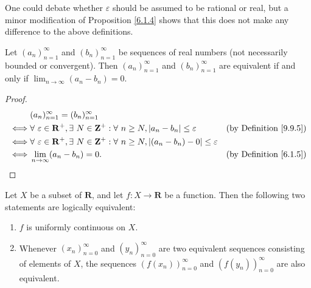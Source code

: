 \begin{remark}\label{9.9.6}
    One could debate whether \(\varepsilon\) should be assumed to be rational or real, but a minor modification of Proposition \ref{6.1.4} shows that this does not make any difference to the above definitions.
\end{remark}

\begin{lemma}\label{9.9.7}
    Let \((a_n)_{n = 1}^\infty\) and \((b_n)_{n = 1}^\infty\) be sequences of real numbers
    (not necessarily bounded or convergent).
    Then \((a_n)_{n = 1}^\infty\) and \((b_n)_{n = 1}^\infty\) are equivalent if and only if \(\lim_{n \to \infty} (a_n - b_n) = 0\).
\end{lemma}

\begin{proof}
    \begin{align*}
             & (a_n)_{n = 1}^\infty = (b_n)_{n = 1}^\infty                                                                                                                          \\
        \iff & \forall\ \varepsilon \in \mathbf{R}^+, \exists\ N \in \mathbf{Z}^+ : \forall\ n \geq N, \abs*{a_n - b_n} \leq \varepsilon       & \text{(by Definition \ref{9.9.5})} \\
        \iff & \forall\ \varepsilon \in \mathbf{R}^+, \exists\ N \in \mathbf{Z}^+ : \forall\ n \geq N, \abs*{(a_n - b_n) - 0} \leq \varepsilon                                      \\
        \iff & \lim_{n \to \infty} (a_n - b_n) = 0.                                                                                            & \text{(by Definition \ref{6.1.5})}
    \end{align*}
\end{proof}

\begin{proposition}\label{9.9.8}
    Let \(X\) be a subset of \(\mathbf{R}\), and let \(f : X \to \mathbf{R}\) be a function.
    Then the following two statements are logically equivalent:
    \begin{enumerate}
        \item \(f\) is uniformly continuous on \(X\).
        \item Whenever \((x_n)_{n = 0}^\infty\) and \((y_n)_{n = 0}^\infty\) are two equivalent sequences consisting of elements of \(X\), the sequences \((f(x_n))_{n = 0}^\infty\) and \((f(y_n))_{n = 0}^\infty\) are also equivalent.
    \end{enumerate}
\end{proposition}

